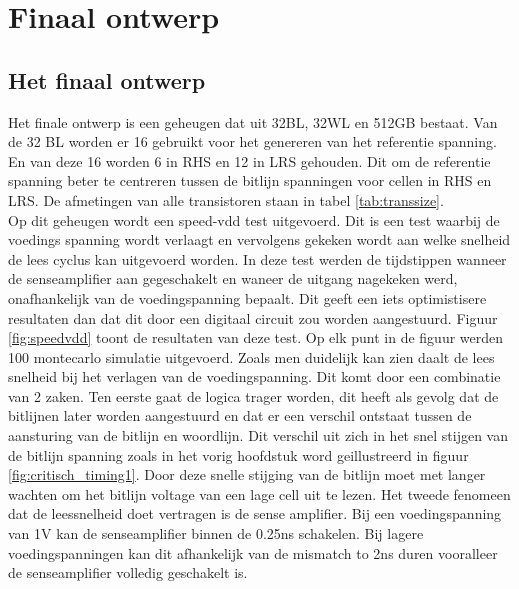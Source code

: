 \chapter{Finaal ontwerp}
\label{final}
\section{Het finaal ontwerp}
Het finale ontwerp is een geheugen dat uit 32BL, 32WL en 512GB bestaat. Van de 32 BL worden er 16 gebruikt voor het genereren van het referentie spanning. En van deze 16 worden 6 in RHS en 12 in LRS gehouden. Dit om de referentie spanning beter te centreren tussen de bitlijn spanningen voor cellen in RHS en LRS. De afmetingen van alle transistoren staan in tabel \ref{tab:transsize}. \\
Op dit geheugen wordt een speed-vdd test uitgevoerd. Dit is een test waarbij de voedings spanning wordt verlaagt en vervolgens gekeken wordt aan welke snelheid de lees cyclus kan uitgevoerd worden. In deze test werden de tijdstippen wanneer de senseamplifier aan gegeschakelt en waneer de uitgang nagekeken werd, onafhankelijk van de voedingspanning bepaalt. Dit geeft een iets optimistisere resultaten dan dat dit door een digitaal circuit zou worden aangestuurd. Figuur \ref{fig:speedvdd} toont de resultaten van deze test. Op elk punt in de figuur werden 100 montecarlo simulatie uitgevoerd. Zoals men duidelijk kan zien  daalt de lees snelheid bij het verlagen van de voedingspanning. Dit komt door een combinatie van 2 zaken. Ten eerste gaat de logica trager worden, dit heeft als gevolg dat de bitlijnen later worden aangestuurd en dat er een verschil ontstaat tussen de aansturing van de bitlijn en woordlijn. Dit verschil uit zich in het snel stijgen van de bitlijn spanning zoals in het vorig hoofdstuk word geillustreerd in figuur \ref{fig:critisch_timing1}. Door deze snelle stijging van de bitlijn moet met langer wachten om het bitlijn voltage van een lage cell uit te lezen. Het tweede fenomeen dat de leessnelheid doet vertragen is de sense amplifier. Bij een voedingspanning van 1V kan de senseamplifier binnen de 0.25ns schakelen. Bij lagere voedingspanningen kan dit afhankelijk van de mismatch to 2ns duren vooralleer de senseamplifier volledig geschakelt is.

